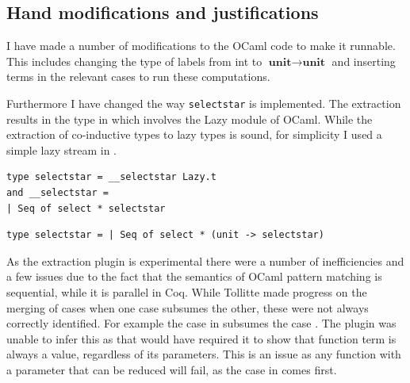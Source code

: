 \documentclass[12pt,twoside,notitlepage]{report}
\begin{document}
\subsection{Hand modifications and justifications}
I have made a number of modifications to the OCaml code to make it runnable. This includes changing the type of labels from int to $ \textbf{unit}\rightarrow\textbf{unit} $ and inserting terms in the relevant cases to run these computations. 

Furthermore I have changed the way \verb|selectstar| is implemented. The extraction results in the type in  which involves the Lazy module of OCaml. While the extraction of co-inductive types to lazy types is sound, for simplicity I used a simple lazy stream in . 

\begin{minipage}{\linewidth}

\begin{lstlisting}[caption={OCaml lazy selectstar}, label={lst:ocamllazystar}]
type selectstar = __selectstar Lazy.t
and __selectstar =
| Seq of select * selectstar
\end{lstlisting}

\end{minipage}

\begin{minipage}{\linewidth}

\begin{lstlisting}[caption={OCaml stream selectstar}, label={lst:ocamlstreamstar}]
type selectstar = | Seq of select * (unit -> selectstar) 
\end{lstlisting}

\end{minipage}

As the extraction plugin is experimental there were a number of inefficiencies and a few issues due to the fact that the semantics of OCaml pattern matching is sequential, while it is parallel in Coq. While Tollitte\cite{tollitte2012producing} made progress on the merging of cases when one case subsumes the other, these were not always correctly identified. For example the case  in  subsumes the case . The plugin was unable to infer this as that would have required it to show that function term is always a value, regardless of its parameters. This is an issue as any function with a parameter that can be reduced will fail, as the case in  comes first.
\end{document}
